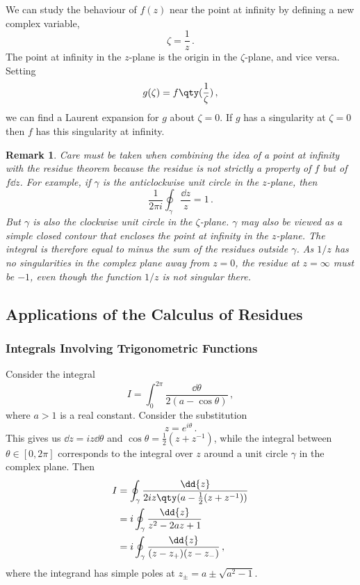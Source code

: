 \documentclass{article}
\theoremstyle{plain}\theoremheaderfont{\normalfont\itshape}\theorembodyfont{\rmfamily}\theoremseparator{.}\newtheorem*{rem}{Remark}\newtheorem*{ex}{Example}\newtheorem*{proof}{Proof}\newtheorem*{altp}{Alternative proof}
\theoremstyle{plain}\theoremheaderfont{\normalfont\bfseries}\theorembodyfont{\rmfamily}\theoremseparator{.}\newtheorem{thm}{Theorem}[section]\newtheorem{lem}[thm]{Lemma}\newtheorem{prop}[thm]{Proposition}\newtheorem*{cor}{Corollary}\newtheorem{defn}[thm]{Definition}\newtheorem{clm}[thm]{Claim}\newtheorem{clminproof}{Claim}
\theoremstyle{break}\theoremheaderfont{\normalfont\itshape}\theorembodyfont{\rmfamily}\theoremseparator{.\medskip}\newtheorem*{proofskip}{Proof}\newtheorem*{exs}{Examples}\newtheorem*{rems}{Remarks}
\theoremstyle{break}\theoremheaderfont{\normalfont\bfseries}\theorembodyfont{\rmfamily}\theoremseparator{.\medskip}\newtheorem{lemskip}[thm]{Lemma}\newtheorem{defnskip}[thm]{Definition}\newtheorem{propskip}[thm]{Proposition}\newtheorem{thmskip}[thm]{Theorem}
\numberwithin{equation}{section}
\begin{document}
	We can study the behaviour of \(f(z)\) near the point at infinity by defining a new complex variable,
	\[\zeta=\frac{1}{z}\,.\]
	The point at infinity in the \(z\)-plane is the origin in the \(\zeta\)-plane, and vice versa. Setting
	\[g(\zeta)=f\qty(\frac{1}{\zeta})\,,\]
	we can find a Laurent expansion for \(g\) about \(\zeta=0\). If \(g\) has a singularity at \(\zeta=0\) then \(f\) has this singularity at infinity.

	\begin{rem}
		Care must be taken when combining the idea of a point at infinity with the residue theorem because the residue is not strictly a property of \(f\) but of \(f\dd{z}\). For example, if \(\gamma\) is the anticlockwise unit circle in the \(z\)-plane, then
		\[\frac{1}{2\pi i}\oint_\gamma\frac{\dd{z}}{z}=1\,.\]
		But \(\gamma\) is also the clockwise unit circle in the \(\zeta\)-plane. \(\gamma\) may also be viewed as a simple closed contour that encloses the point at infinity in the \(z\)-plane. The integral is therefore equal to minus the sum of the residues outside \(\gamma\). As \(1/z\) has no singularities in the complex plane away from \(z=0\), the residue at \(z=\infty\) must be \(-1\), even though the function \(1/z\) is not singular there.
	\end{rem}
	\subsection{Applications of the Calculus of Residues}
	\subsubsection{Integrals Involving Trigonometric Functions}
	Consider the integral
	\[I=\int_{0}^{2\pi}\frac{\dd{\theta}}{2(a-\cos\theta)}\,,\]
	where \(a>1\) is a real constant. Consider the substitution
	\[z=e^{i\theta}\,.\]
	This gives us \(\dd{z}=iz\dd{\theta}\) and \(\cos\theta=\frac{1}{2}(z+z^{-1})\), while the integral between \(\theta\in[0,2\pi]\) corresponds to the integral over \(z\) around a unit circle \(\gamma\) in the complex plane. Then
	\begin{align*}
		I&=\oint_\gamma\frac{\dd{z}}{2iz\qty(a-\frac{1}{2}(z+z^{-1}))}\\
		&=i\oint_\gamma\frac{\dd{z}}{z^2-2az+1}\\
		&=i\oint_\gamma\frac{\dd{z}}{(z-z_+)(z-z_-)}\,,
	\end{align*}
	where the integrand has simple poles at \(z_\pm=a\pm\sqrt{a^2-1}\).
\end{document}

